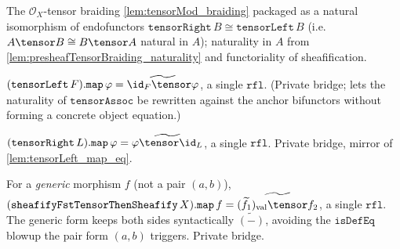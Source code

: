 \begin{definition}

  \label{def:tensorBraidingNatIso}
  The $\mathcal{O}_X$-tensor braiding \cref{lem:tensorMod_braiding} packaged as a natural
  isomorphism of endofunctors $\texttt{tensorRight}\,B \cong \texttt{tensorLeft}\,B$ (i.e.
  $A \tensor B \cong B \tensor A$ natural in $A$); naturality in $A$ from
  \cref{lem:presheafTensorBraiding_naturality} and functoriality of sheafification.
\end{definition}

\begin{lemma}

  \label{lem:tensorLeft_map_eq}
  $(\texttt{tensorLeft}\,F).\texttt{map}\,\varphi = \widetilde{\id_F \tensor \varphi}$, a
  single $\texttt{rfl}$. (Private bridge; lets the naturality of $\texttt{tensorAssoc}$ be
  rewritten against the anchor bifunctors without forming a concrete object equation.)
\end{lemma}

\begin{lemma}

  \label{lem:tensorRight_map_eq}
  $(\texttt{tensorRight}\,L).\texttt{map}\,\varphi = \widetilde{\varphi \tensor \id_L}$, a
  single $\texttt{rfl}$. Private bridge, mirror of \cref{lem:tensorLeft_map_eq}.
\end{lemma}

\begin{lemma}

  \label{lem:sheafifyFst_map_eq}
  For a \emph{generic} morphism $f$ (not a pair $(a,b)$),
  $(\texttt{sheafifyFstTensorThenSheafify}\,X).\texttt{map}\,f
  = \widetilde{(\widetilde{f_1})_{\mathrm{val}} \tensor f_2}$, a single $\texttt{rfl}$. The
  generic form keeps both sides syntactically $\widetilde{(-)}$, avoiding the $\texttt{isDefEq}$
  blowup the pair form $(a,b)$ triggers. Private bridge.
\end{lemma}

